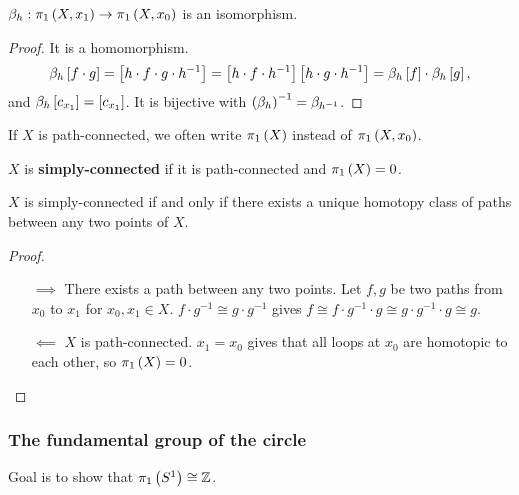 \begin{proposition}
$ \beta_h : \pi_1\rb{X, x_1} \to \pi_1\rb{X, x_0} $ is an isomorphism.
\end{proposition}

\begin{proof}
It is a homomorphism.
$$ \beta_h\sb{f \cdot g} = \sb{h \cdot f \cdot g \cdot h^{-1}} = \sb{h \cdot f \cdot h^{-1}}\sb{h \cdot g \cdot h^{-1}} = \beta_h\sb{f} \cdot \beta_h\sb{g}, $$
and $ \beta_h\sb{c_{x_1}} = \sb{c_{x_1}} $. It is bijective with $ \rb{\beta_h}^{-1} = \beta_{h^{-1}} $.
\end{proof}

If $ X $ is path-connected, we often write $ \pi_1\rb{X} $ instead of $ \pi_1\rb{X, x_0} $.

\begin{definition*}
$ X $ is \textbf{simply-connected} if it is path-connected and $ \pi_1\rb{X} = 0 $.
\end{definition*}

\begin{proposition}
\label{prop:1.6}
$ X $ is simply-connected if and only if there exists a unique homotopy class of paths between any two points of $ X $.
\end{proposition}

\begin{proof}
\hfill
\begin{itemize}
\item[$ \implies $] There exists a path between any two points. Let $ f, g $ be two paths from $ x_0 $ to $ x_1 $ for $ x_0, x_1 \in X $. $ f \cdot g^{-1} \cong g \cdot g^{-1} $ gives $ f \cong f \cdot g^{-1} \cdot g \cong g \cdot g^{-1} \cdot g \cong g $.
\item[$ \impliedby $] $ X $ is path-connected. $ x_1 = x_0 $ gives that all loops at $ x_0 $ are homotopic to each other, so $ \pi_1\rb{X} = 0 $.
\end{itemize}
\end{proof}

\subsubsection{The fundamental group of the circle}

Goal is to show that $ \pi_1\rb{S^1} \cong \Z $.


